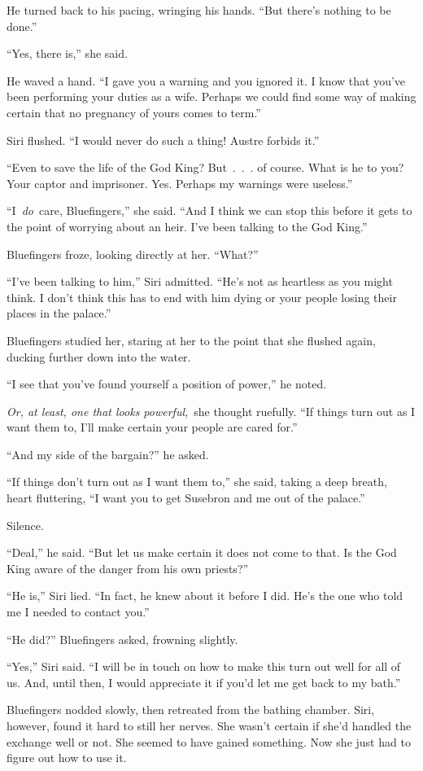He turned back to his pacing, wringing his hands. “But there’s nothing to be done.”

“Yes, there is,” she said.

He waved a hand. “I gave you a warning and you ignored it. I know that you’ve been performing your duties as a wife. Perhaps we could find some way of making certain that no pregnancy of yours comes to term.”

Siri flushed. “I would never do such a thing! Austre forbids it.”

“Even to save the life of the God King? But~.~.~. of course. What is he to you? Your captor and imprisoner. Yes. Perhaps my warnings were useless.”

“I~\textit{do}~care, Bluefingers,” she said. “And I think we can stop this before it gets to the point of worrying about an heir. I’ve been talking to the God King.”

Bluefingers froze, looking directly at her. “What?”

“I’ve been talking to him,” Siri admitted. “He’s not as heartless as you might think. I don’t think this has to end with him dying or your people losing their places in the palace.”

Bluefingers studied her, staring at her to the point that she flushed again, ducking further down into the water.

“I see that you’ve found yourself a position of power,” he noted.

\textit{Or, at least, one that looks powerful,}~she thought ruefully. “If things turn out as I want them to, I’ll make certain your people are cared for.”

“And my side of the bargain?” he asked.

“If things don’t turn out as I want them to,” she said, taking a deep breath, heart fluttering, “I want you to get Susebron and me out of the palace.”

Silence.

“Deal,” he said. “But let us make certain it does not come to that. Is the God King aware of the danger from his own priests?”

“He is,” Siri lied. “In fact, he knew about it before I did. He’s the one who told me I needed to contact you.”

“He did?” Bluefingers asked, frowning slightly.

“Yes,” Siri said. “I will be in touch on how to make this turn out well for all of us. And, until then, I would appreciate it if you’d let me get back to my bath.”

Bluefingers nodded slowly, then retreated from the bathing chamber. Siri, however, found it hard to still her nerves. She wasn’t certain if she’d handled the exchange well or not. She seemed to have gained something. Now she just had to figure out how to use it.

